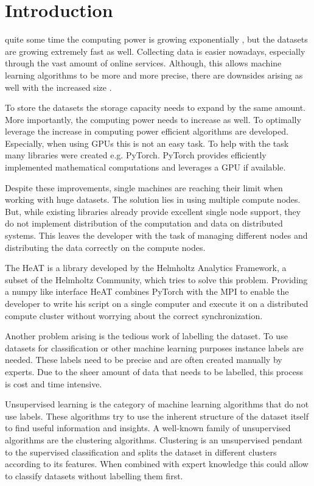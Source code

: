 
\section{Introduction}
\label{sec:intro}
  quite some time the computing power is growing exponentially \cite{moore_cramming_1998}, but the datasets are growing extremely fast as well.
Collecting data is easier nowadays, especially through the vast amount of online services.
Although, this allows machine learning algorithms to be more and more precise, there are downsides arising as well with
the increased size \cite{khan_big_2014}.

To store the datasets the storage capacity needs to expand by the same amount. More importantly, the computing power needs to increase
as well. To optimally leverage the increase in computing power efficient algorithms are developed.
Especially, when using \glspl{GPU} this is not an easy task. To help with the task many libraries were created e.g. PyTorch.
\gls{PyTorch} provides efficiently implemented mathematical computations and leverages a \gls{GPU} if available.

Despite these improvements, single machines are reaching their limit when working with huge datasets. The solution lies in using multiple compute nodes.
But, while existing libraries already provide excellent single node support, they do not implement distribution of the computation and data on distributed systems.
This leaves the developer with the task of managing different nodes and distributing the data correctly on the compute nodes.

The \gls{HeAT} is a library developed by the Helmholtz Analytics Framework, a subset of the Helmholtz Community, which tries to solve this problem.
Providing a \gls{numpy} like interface \gls{HeAT} combines \gls{PyTorch} with the \gls{MPI} to enable the developer to write his script on a single computer
and execute it on a distributed compute cluster without worrying about the correct synchronization.

Another problem arising is the tedious work of labelling the dataset.
To use datasets for classification or other machine learning purposes instance labels are needed.
These labels need to be precise and are often created manually by experts.
Due to the sheer amount of data that needs to be labelled, this process is cost and time intensive.

Unsupervised learning is the category of machine learning algorithms that do not use labels. These algorithms try to
use the inherent structure of the dataset itself to find useful information and insights.
A well-known family of unsupervised algorithms are the clustering algorithms. Clustering is an unsupervised pendant to the supervised classification
and splits the dataset in different clusters according to its features.
When combined with expert knowledge this could allow to classify datasets without labelling them first.

